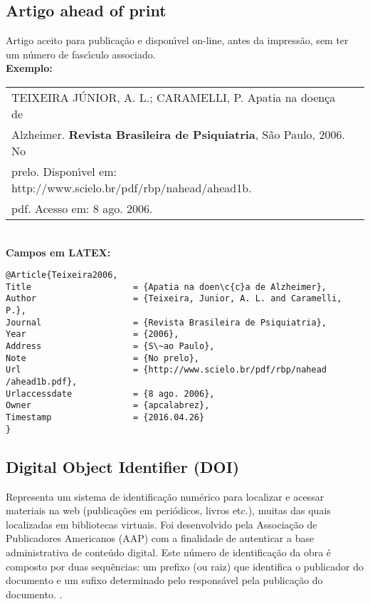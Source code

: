 \subsection{Artigo ahead of print}

Artigo aceito para publica\c{c}\~ao e dispon\'{\i}vel on-line, antes da impress\~ao,
sem ter um n\'umero de fasc\'{\i}culo associado. \\

\textbf{Exemplo:} \\


\begin{tabular}{|l|c|} \hline
	TEIXEIRA J\'UNIOR, A. L.; CARAMELLI, P. Apatia na doen\c{c}a de \\Alzheimer. \textbf{Revista Brasileira de Psiquiatria}, S\~ao Paulo, 2006. No\\ prelo. Dispon\'{\i}vel em:
	http://www.scielo.br/pdf/rbp/nahead/ahead1b.\\pdf. Acesso em: 8 ago.
	2006. 
	\\\hline
\end{tabular} \\

\textbf{Campos em LATEX:} 

\begin{verbatim}
@Article{Teixeira2006,
Title                    = {Apatia na doen\c{c}a de Alzheimer},
Author                   = {Teixeira, Junior, A. L. and Caramelli, 
P.},
Journal                  = {Revista Brasileira de Psiquiatria},
Year                     = {2006},
Address                  = {S\~ao Paulo},
Note                     = {No prelo},
Url                      = {http://www.scielo.br/pdf/rbp/nahead
/ahead1b.pdf},
Urlaccessdate            = {8 ago. 2006},
Owner                    = {apcalabrez},
Timestamp                = {2016.04.26}
}
\end{verbatim}

\subsection{Digital Object Identifier (DOI)}

Representa um sistema de identifica\c{c}\~ao num\'erico para localizar e
acessar materiais na web (publica\c{c}\~oes em peri\'odicos, livros etc.), muitas
das quais localizadas em bibliotecas virtuais. Foi desenvolvido pela
Associa\c{c}\~ao de Publicadores Americanos (AAP) com a finalidade de autenticar a base administrativa de conte\'udo digital. Este n\'umero de
identifica\c{c}\~ao da obra \'e composto por duas sequ\^encias: um prefixo (ou
raiz) que identifica o publicador do documento e um sufixo determinado
pelo respons\'avel pela publica\c{c}\~ao do documento. \cite{Doic2016}.

